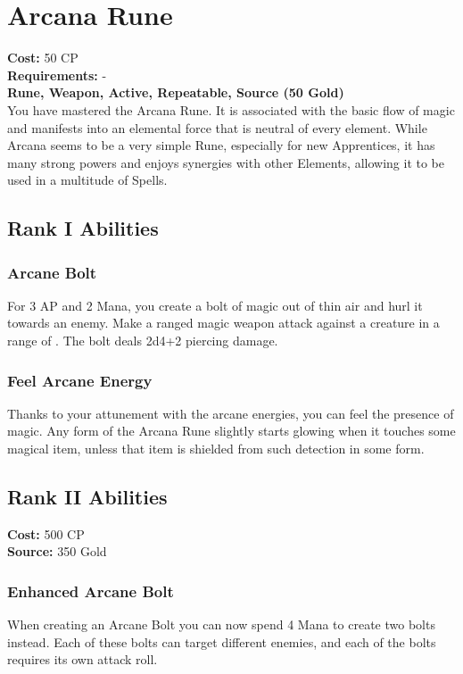\section{Arcana Rune}\label{rune:arcana}
\textbf{Cost:} 50 CP\\
\textbf{Requirements:} -\\
\textbf{Rune, Weapon, Active, Repeatable, Source (50 Gold)}\\
You have mastered the Arcana Rune.
It is associated with the basic flow of magic and manifests into an elemental force that is neutral of every element.
While Arcana seems to be a very simple Rune, especially for new Apprentices, it has many strong powers and enjoys synergies with other Elements, allowing it to be used in a multitude of Spells.\\

\subsection{Rank I Abilities}

\subsubsection{Arcane Bolt}
For 3 AP and 2 Mana, you create a bolt of magic out of thin air and hurl it towards an enemy.
Make a ranged magic weapon attack against a creature in a range of .
The bolt deals 2d4+2 piercing damage.

\subsubsection{Feel Arcane Energy}
Thanks to your attunement with the arcane energies, you can feel the presence of magic.
Any form of the Arcana Rune slightly starts glowing when it touches some magical item, unless that item is shielded from such detection in some form.

\subsection{Rank II Abilities}
\textbf{Cost:} 500 CP\\
\textbf{Source:} 350 Gold
\subsubsection{Enhanced Arcane Bolt}
When creating an Arcane Bolt you can now spend 4 Mana to create two bolts instead.
Each of these bolts can target different enemies, and each of the bolts requires its own attack roll.


